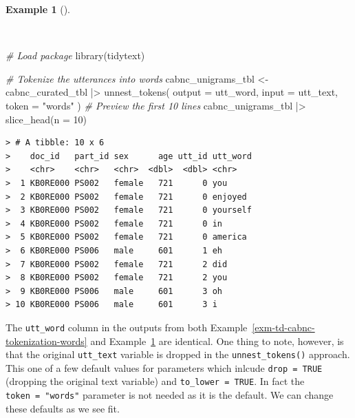 \documentclass[
  letterpaper,
  DIV=11,
  numbers=noendperiod]{scrreport}
\newenvironment{Shaded}{\begin{snugshade}}{\end{snugshade}}
\newcommand{\AttributeTok}[1]{\textcolor[rgb]{0.00,0.00,0.00}{#1}}
\newcommand{\CommentTok}[1]{\textcolor[rgb]{0.00,0.00,0.00}{\textit{#1}}}
\newcommand{\DecValTok}[1]{\textcolor[rgb]{0.00,0.00,0.00}{#1}}
\newcommand{\FunctionTok}[1]{\textcolor[rgb]{0.00,0.00,0.00}{#1}}
\newcommand{\NormalTok}[1]{\textcolor[rgb]{0.00,0.00,0.00}{#1}}
\newcommand{\OtherTok}[1]{\textcolor[rgb]{0.00,0.00,0.00}{#1}}
\newcommand{\SpecialCharTok}[1]{\textcolor[rgb]{0.00,0.00,0.00}{#1}}
\newcommand{\StringTok}[1]{\textcolor[rgb]{0.00,0.00,0.00}{#1}}
\theoremstyle{definition}
\newtheorem{example}{Example}[chapter]
\theoremstyle{remark}
\begin{document}
\begin{example}[]\protect\hypertarget{exm-td-cabnc-tokenization-words-tidytext}{}\label{exm-td-cabnc-tokenization-words-tidytext}

~

\begin{Shaded}
\begin{Highlighting}[]
\CommentTok{\# Load package}
\FunctionTok{library}\NormalTok{(tidytext)}

\CommentTok{\# Tokenize the utterances into words}
\NormalTok{cabnc\_unigrams\_tbl }\OtherTok{\textless{}{-}} 
\NormalTok{  cabnc\_curated\_tbl }\SpecialCharTok{|\textgreater{}}
  \FunctionTok{unnest\_tokens}\NormalTok{(}
    \AttributeTok{output =}\NormalTok{ utt\_word, }
    \AttributeTok{input =}\NormalTok{ utt\_text, }
    \AttributeTok{token =} \StringTok{"words"}
\NormalTok{  )}
\CommentTok{\# Preview the first 10 lines}
\NormalTok{cabnc\_unigrams\_tbl }\SpecialCharTok{|\textgreater{}}
  \FunctionTok{slice\_head}\NormalTok{(}\AttributeTok{n =} \DecValTok{10}\NormalTok{)}
\end{Highlighting}
\end{Shaded}

\begin{verbatim}
> # A tibble: 10 x 6
>    doc_id   part_id sex      age utt_id utt_word
>    <chr>    <chr>   <chr>  <dbl>  <dbl> <chr>   
>  1 KB0RE000 PS002   female   721      0 you     
>  2 KB0RE000 PS002   female   721      0 enjoyed 
>  3 KB0RE000 PS002   female   721      0 yourself
>  4 KB0RE000 PS002   female   721      0 in      
>  5 KB0RE000 PS002   female   721      0 america 
>  6 KB0RE000 PS006   male     601      1 eh      
>  7 KB0RE000 PS002   female   721      2 did     
>  8 KB0RE000 PS002   female   721      2 you     
>  9 KB0RE000 PS006   male     601      3 oh      
> 10 KB0RE000 PS006   male     601      3 i
\end{verbatim}

\end{example}

The \texttt{utt\_word} column in the outputs from both
Example~\ref{exm-td-cabnc-tokenization-words} and
Example~\ref{exm-td-cabnc-tokenization-words-tidytext} are identical.
One thing to note, however, is that the original \texttt{utt\_text}
variable is dropped in the \texttt{unnest\_tokens()} approach. This one
of a few default values for parameters which inlcude
\texttt{drop\ =\ TRUE} (dropping the original text variable) and
\texttt{to\_lower\ =\ TRUE}. In fact the \texttt{token\ =\ "words"}
parameter is not needed as it is the default. We can change these
defaults as we see fit.
\end{document}
